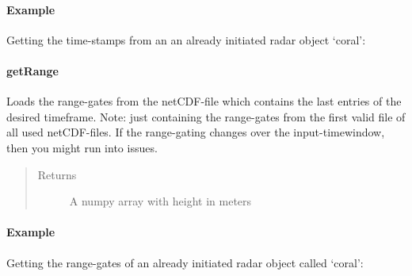 \documentclass[letterpaper,10pt,english]{sphinxmanual}
\begin{document}
\begin{fulllineitems}
\begin{fulllineitems}
\paragraph{Example}

Getting the time-stamps from an an already initiated radar object ‘coral’:

\begin{sphinxVerbatim}[commandchars=\\\{\}]
\end{sphinxVerbatim}

\end{fulllineitems}



\paragraph{getRange}
\label{\detokenize{generated/MPPy.Instruments.Radar.Radar.getRange:getrange}}\label{\detokenize{generated/MPPy.Instruments.Radar.Radar.getRange::doc}}

\begin{fulllineitems}
\label{\detokenize{generated/MPPy.Instruments.Radar.Radar.getRange:MPPy.Instruments.Radar.Radar.getRange}}
Loads the range-gates from the netCDF-file which contains the last entries of the desired timeframe.
Note: just containing the range-gates from the first valid file of all used netCDF-files. If the range-gating
changes over the input-timewindow, then you might run into issues.
\begin{quote}\begin{description}
\item[{Returns}] \leavevmode
A numpy array with height in meters

\end{description}\end{quote}
\paragraph{Example}

Getting the range-gates of an already initiated radar object called ‘coral’:

\begin{sphinxVerbatim}[commandchars=\\\{\}]
\end{sphinxVerbatim}


\end{fulllineitems}
\end{fulllineitems}
\end{document}
